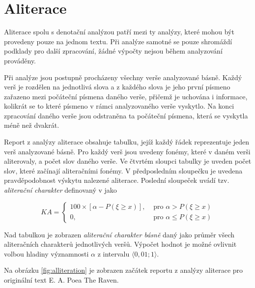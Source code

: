 \documentclass[dp.tex]{subfiles}
\begin{document}
\section{Aliterace}

Aliterace spolu s denotační analýzou patří mezi ty analýzy, které mohou být provedeny pouze na jednom textu. Při analýze samotné se pouze shromáždí podklady pro další zpracování, žádné výpočty nejsou během analyzování prováděny.

Při analýze jsou postupně procházeny všechny verše analyzované básně. Každý verš je rozdělen na jednotlivá slova a z každého slova je jeho první písmeno zařazeno mezi počáteční písmena daného verše, přičemž je uchována i informace, kolikrát se to které písmeno v rámci analyzovaného verše vyskytlo. Na konci zpracování daného verše jsou odstraněna ta počáteční písmena, která se vyskytla méně než dvakrát.

Report z analýzy aliterace obsahuje tabulku, jejíž každý řádek reprezentuje jeden verš analyzované básně. Pro každý verš jsou uvedeny fonémy, které v daném verši aliterovaly, a počet slov daného verše. Ve čtvrtém sloupci tabulky je uveden počet slov, které začínají aliteračními fonémy. V předposledním sloupečku je uvedena pravděpodobnost výskytu nalezené aliterace. Poslední sloupeček uvádí tzv. \textit{aliterační charakter} definovaný v \cite[str.~60]{Wimmer2003} jako

\[{K\!A} = \left\{
  \begin{array}{lr}
    100 \times [ \alpha - P( \xi \geq x)],& \text{ pro } \alpha >  P( \xi \geq x)\\
    0,& \text{ pro } \alpha \leq  P( \xi \geq x)
  \end{array}
\right.
\]

Nad tabulkou je zobrazen \textit{aliterační charakter básně} daný jako průměr všech aliteračních charakterů jednotlivých veršů. Výpočet hodnot \KA je možné ovlivnit volbou hladiny významnosti $\alpha$ z intervalu $\langle 0{,}01; 1 \rangle$.

Na obrázku \ref{fig:alliteration} je zobrazen začátek reportu z analýzy aliterace pro originální text E. A. Poea The Raven.\newpage
\end{document}
